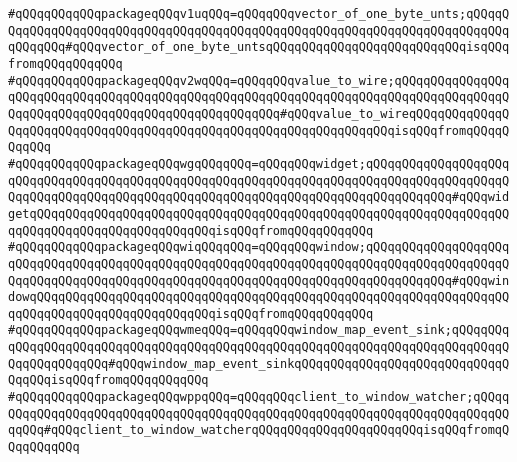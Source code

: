 \verb|#qQQqqQQqqQQqpackageqQQqv1uqQQq=qQQqqQQqvector_of_one_byte_unts;qQQqqQQqqQQqqQQqqQQqqQQqqQQqqQQqqQQqqQQqqQQqqQQqqQQqqQQqqQQqqQQqqQQqqQQqqQQqqQQqqQQq#qQQqvector_of_one_byte_untsqQQqqQQqqQQqqQQqqQQqqQQqqQQqisqQQqfromqQQqqQQqqQQq|\newline
\verb|#qQQqqQQqqQQqpackageqQQqv2wqQQq=qQQqqQQqvalue_to_wire;qQQqqQQqqQQqqQQqqQQqqQQqqQQqqQQqqQQqqQQqqQQqqQQqqQQqqQQqqQQqqQQqqQQqqQQqqQQqqQQqqQQqqQQqqQQqqQQqqQQqqQQqqQQqqQQqqQQqqQQqqQQq#qQQqvalue_to_wireqQQqqQQqqQQqqQQqqQQqqQQqqQQqqQQqqQQqqQQqqQQqqQQqqQQqqQQqqQQqqQQqqQQqisqQQqfromqQQqqQQqqQQq|\newline
\verb|#qQQqqQQqqQQqpackageqQQqwgqQQqqQQq=qQQqqQQqwidget;qQQqqQQqqQQqqQQqqQQqqQQqqQQqqQQqqQQqqQQqqQQqqQQqqQQqqQQqqQQqqQQqqQQqqQQqqQQqqQQqqQQqqQQqqQQqqQQqqQQqqQQqqQQqqQQqqQQqqQQqqQQqqQQqqQQqqQQqqQQqqQQqqQQqqQQq#qQQqwidgetqQQqqQQqqQQqqQQqqQQqqQQqqQQqqQQqqQQqqQQqqQQqqQQqqQQqqQQqqQQqqQQqqQQqqQQqqQQqqQQqqQQqqQQqqQQqqQQqisqQQqfromqQQqqQQqqQQq|\newline
\verb|#qQQqqQQqqQQqpackageqQQqwiqQQqqQQq=qQQqqQQqwindow;qQQqqQQqqQQqqQQqqQQqqQQqqQQqqQQqqQQqqQQqqQQqqQQqqQQqqQQqqQQqqQQqqQQqqQQqqQQqqQQqqQQqqQQqqQQqqQQqqQQqqQQqqQQqqQQqqQQqqQQqqQQqqQQqqQQqqQQqqQQqqQQqqQQqqQQq#qQQqwindowqQQqqQQqqQQqqQQqqQQqqQQqqQQqqQQqqQQqqQQqqQQqqQQqqQQqqQQqqQQqqQQqqQQqqQQqqQQqqQQqqQQqqQQqqQQqqQQqisqQQqfromqQQqqQQqqQQq|\newline
\verb|#qQQqqQQqqQQqpackageqQQqwmeqQQq=qQQqqQQqwindow_map_event_sink;qQQqqQQqqQQqqQQqqQQqqQQqqQQqqQQqqQQqqQQqqQQqqQQqqQQqqQQqqQQqqQQqqQQqqQQqqQQqqQQqqQQqqQQqqQQq#qQQqwindow_map_event_sinkqQQqqQQqqQQqqQQqqQQqqQQqqQQqqQQqqQQqisqQQqfromqQQqqQQqqQQq|\newline
\verb|#qQQqqQQqqQQqpackageqQQqwppqQQq=qQQqqQQqclient_to_window_watcher;qQQqqQQqqQQqqQQqqQQqqQQqqQQqqQQqqQQqqQQqqQQqqQQqqQQqqQQqqQQqqQQqqQQqqQQqqQQqqQQq#qQQqclient_to_window_watcherqQQqqQQqqQQqqQQqqQQqqQQqisqQQqfromqQQqqQQqqQQq|\newline
